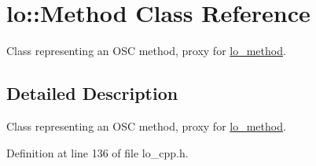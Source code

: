 \hypertarget{classlo_1_1Method}{\section{lo\+:\+:Method Class Reference}
\label{classlo_1_1Method}
}


Class representing an O\+S\+C method, proxy for \hyperlink{lo__types_8h_a66faedf5da13231d8c0166870477dce5}{lo\+\_\+method}.  




\subsection{Detailed Description}
Class representing an O\+S\+C method, proxy for \hyperlink{lo__types_8h_a66faedf5da13231d8c0166870477dce5}{lo\+\_\+method}. 

Definition at line 136 of file lo\+\_\+cpp.\+h.

